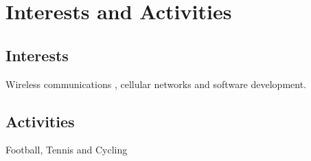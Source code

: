 \documentclass[a4paper,10pt]{article}
\begin{document}
\section{Interests and Activities}
\subsection*{Interests}
Wireless communications , cellular networks and software development.\\
\subsection*{Activities}
Football, Tennis and Cycling



\end{document}
